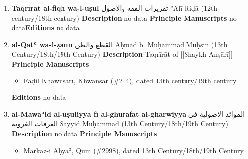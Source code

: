 \documentclass{article}
\begin{document}
\begin{enumerate}
      \item \textbf{Taqrīrāt al-fiqh wa-l-uṣūl}
        \newline
        \textarabic{تقريرات الفقه والأصول}
        \newline
        ʿAlī Riḍā
        \newline
        (12th century/18th century)
        \newline
        \newline
        \textbf{Description}
        \newline	
        no data
        \newline
        \newline
    \textbf{Principle Manuscripts}
\newline
no data\newline\textbf{Editions}
\newline
no data\newline
      \item \textbf{al-Qatʿ wa-l-ẓann}
        \newline
        \textarabic{القطع والظن}
        \newline
        Aḥmad b. Muḥammad Muḥsin
        \newline
        (13th Century/18th/19th Century)
        \newline
        \newline
        \textbf{Description}
        \newline	
        Taqrīrāt of [[Shaykh Anṣārī]]
        \newline
        \newline
    \textbf{Principle Manuscripts}
\begin{itemize}
    \item Fāḍil Khawnsārī, Khwansar (\#214), dated 13th century/19th century
    \end{itemize}
\textbf{Editions}
\newline
no data\newline
      \item \textbf{al-Mawāʾid al-uṣūliyya fī al-ghurafāt al-gharwiyya}
        \newline
        \textarabic{الموائد الاصولية في الغرفات الغروية}
        \newline
        Sayyid Muḥammad
        \newline
        (13th Century/18th/19th Century)
        \newline
        \newline
        \textbf{Description}
        \newline	
        no data
        \newline
        \newline
    \textbf{Principle Manuscripts}
\begin{itemize}
    \item Markaz-i Aḥyāʾ, Qum (\#2998), dated 13th Century/18th/19th Century
    

\end{itemize}
\end{enumerate}
\end{document}
